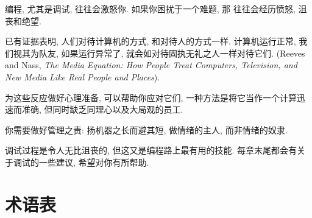 \documentclass[10pt]{book}
\begin{document}
编程, 尤其是调试, 往往会激怒你. 如果你困扰于一个难题, 那
往往会经历愤怒, 沮丧和绝望. 

已有证据表明, 人们对待计算机的方式, 和对待人的方式一样. 
计算机运行正常, 我们视其为队友, 如果运行异常了, 
就会如对待固执无礼之人一样对待它们. 
 (Reeves and Nass, {\it The Media
 Equation: How People Treat Computers, Television, and New Media
 Like Real People and Places}).

为这些反应做好心理准备, 可以帮助你应对它们, 一种方法是将它当作一个计算迅速而准确, 
但同时缺乏同理心以及大局观的员工. 

你需要做好管理之责: 扬机器之长而避其短, 做情绪的主人, 而非情绪的奴隶. 

调试过程是令人无比沮丧的, 但这又是编程路上最有用的技能. 
每章末尾都会有关于调试的一些建议, 希望对你有所帮助. 


\section{术语表}
\end{document}
